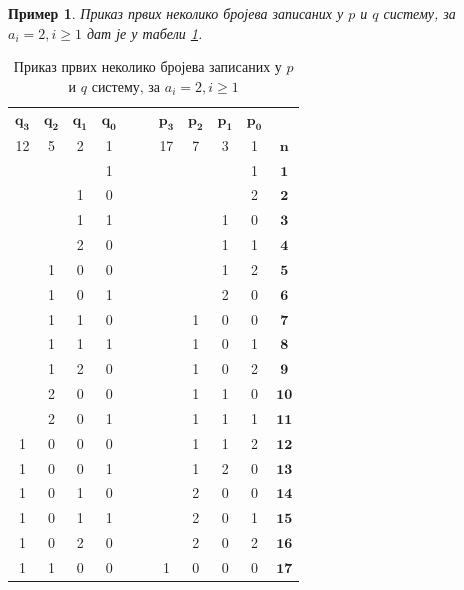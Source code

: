 \documentclass[a4paper]{article}
\newtheorem{example}{Пример}
\begin{document}
\begin{example}
	Приказ првих неколико бројева записаних у $ p $ и $ q $ систему, за $ a_{i} = 2 , i \ge 1 $ дат је у табели \ref{tab:p_q_sistem}.
\end{example}

\begin{table}[h!]
	\caption{Приказ првих неколико бројева записаних у $ p $ и $ q $ систему, за $ a_{i} = 2 , i \ge 1 $}
	\label{tab:p_q_sistem}
	\begin{center}
		\begin{tabular}{ | c | c | c | c | c  c | c | c | c | c | c |}
			\hline
			{$ \mathbf{q_{3}} $} &  {$ \mathbf{q_{2}} $} &  {$ \mathbf{q_{1}} $} &  {$ \mathbf{q_{0}} $} & & &  {$ \mathbf{p_{3}} $} &  {$ \mathbf{p_{2}} $} &  {$ \mathbf{p_{1}} $} &  {$ \mathbf{p_{0}} $} &\\
			12 & 5 & 2 & 1 & & & 17 & 7 & 3 & 1 &  {$ \mathbf{n} $}\\
			\hline
			&  &  & 1 & & &  &  &  & 1 & {$ \mathbf{1} $}\\
			&  & 1 & 0 & & &  &  &  & 2 & {$ \mathbf{2} $}\\
			&  & 1 & 1 & & &  &  & 1 & 0 &  {$ \mathbf{3} $}\\
			&  & 2 & 0 & & &  &  & 1 & 1 &  {$ \mathbf{4} $}\\
			& 1 & 0 & 0 & & &  &  & 1 & 2 &  {$ \mathbf{5} $}\\
			& 1 & 0 & 1 & & &  &  & 2 & 0 &  {$ \mathbf{6} $}\\
			& 1 & 1 & 0 & & &  & 1 & 0 & 0 &  {$ \mathbf{7} $}\\
			& 1 & 1 & 1 & & &  & 1 & 0 & 1 &  {$ \mathbf{8} $}\\
			& 1 & 2 & 0 & & &  & 1 & 0 & 2 &  {$ \mathbf{9} $}\\
			& 2 & 0 & 0 & & &  & 1 & 1 & 0 &  {$ \mathbf{10} $}\\
			& 2 & 0 & 1 & & &  & 1 & 1 & 1 &  {$ \mathbf{11} $}\\
			 1 & 0 & 0 & 0 & & & & 1 & 1 & 2 &  {$ \mathbf{12} $}\\
			 1 & 0 & 0 & 1 & & & & 1 & 2 & 0 &  {$ \mathbf{13} $}\\
			 1 & 0 & 1 & 0 & & & & 2 & 0 & 0 &  {$ \mathbf{14} $}\\
			 1 & 0 & 1 & 1 & & & & 2 & 0 & 1 &  {$ \mathbf{15} $}\\
			 1 & 0 & 2 & 0 & & & & 2 & 0 & 2 &  {$ \mathbf{16} $}\\
			 1 & 1 & 0 & 0 & & & 1 & 0 & 0 & 0 &  {$ \mathbf{17} $}\\
			\hline 
		\end{tabular}
	\end{center}
\end{table}
\end{document}

